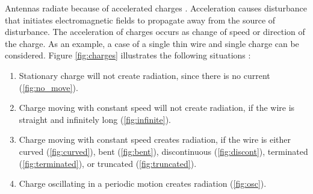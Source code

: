 Antennas radiate because of accelerated charges \cite{stutzman}. Acceleration causes disturbance that initiates electromagnetic fields to propagate away from the source of disturbance. The acceleration of charges occurs as change of speed or direction of the charge. As an example, a case of a single thin wire and single charge can be considered. Figure \ref{fig:charges} illustrates the following situations \cite{saunders, balanis}:
\begin{enumerate}
    \item Stationary charge will not create radiation, since there is no current (\ref{fig:no_move}).
    \item Charge moving with constant speed will not create radiation, if the wire is straight and infinitely long (\ref{fig:infinite}).
    \item Charge moving with constant speed creates radiation, if the wire is either curved (\ref{fig:curved}), bent (\ref{fig:bent}), discontinuous (\ref{fig:discont}), terminated (\ref{fig:terminated}), or truncated (\ref{fig:truncated}).
    \item Charge oscillating in a periodic motion creates radiation (\ref{fig:osc}).
\end{enumerate}

